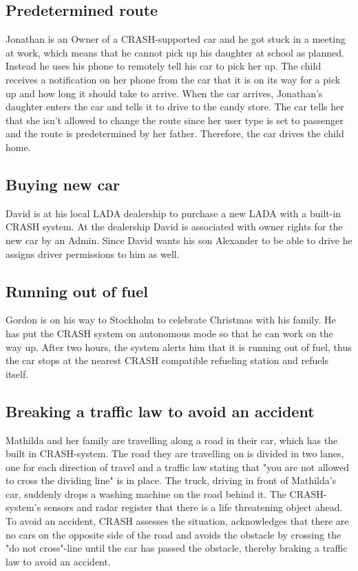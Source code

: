 \documentclass{article}
\begin{document}
\subsection {Predetermined route}
\noindent Jonathan is an Owner of a CRASH-supported car and he got stuck in a meeting at work, which means that he cannot pick up his daughter at school as planned. Instead he uses his phone to remotely tell his car to pick her up. The child receives a notification on her phone from the car that it is on its way for a pick up and how long it should take to arrive. When the car arrives, Jonathan’s daughter enters the car and tells it to drive to the candy store. The car tells her that she isn't allowed to change the route since her user type is set to passenger and the route is predetermined by her father. Therefore, the car drives the child home.

\subsection {Buying new car}
\noindent David is at his local LADA dealership to purchase a new LADA with a built-in CRASH system. At the dealership David is associated with owner rights for the new car by an Admin. Since David wants his son Alexander to be able to drive he assigns driver permissions to him as well.

\subsection {Running out of fuel}
\noindent Gordon is on his way to Stockholm to celebrate Christmas with his family. He has put the CRASH system on autonomous mode so that he can work on the way up. After two hours, the system alerts him that it is running out of fuel, thus the car stops at the nearest CRASH compatible refueling station and refuels itself.

\subsection {Breaking a traffic law to avoid an accident}
\noindent Mathilda and her family are travelling along a road in their car, which has the built in CRASH-system. The road they are travelling on is divided in two lanes, one for each direction of travel and a traffic law stating that "you are not allowed to cross the dividing line" is in place. The truck, driving in front of Mathilda's car, suddenly drops a washing machine on the road behind it. The CRASH-system's sensors and radar register that there is a life threatening object ahead. To avoid an accident, CRASH assesses the situation, acknowledges that there are no cars on the opposite side of the road and avoids the obstacle by crossing the "do not cross"-line until the car has passed the obstacle, thereby braking a traffic law to avoid an accident.
\end{document}
